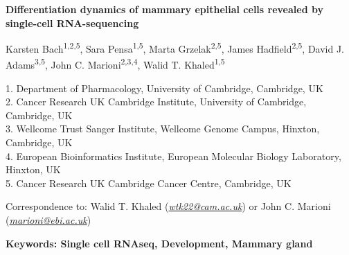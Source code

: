 \documentclass[titlepage, 12pt, oneside]{amsart}
\begin{document}
\begin{titlepage}
\large
\textbf{Differentiation dynamics of mammary epithelial cells revealed by
single-cell RNA-sequencing}
\normalsize

\small
Karsten Bach\textsuperscript{1,2,5}, Sara Pensa\textsuperscript{1,5},
Marta Grzelak\textsuperscript{2,5}, James Hadfield\textsuperscript{2,5},
David J. Adams\textsuperscript{3,5}, John C.
Marioni\textsuperscript{2,3,4}, Walid T. Khaled\textsuperscript{1,5 }

1. Department of Pharmacology, University of Cambridge, Cambridge, UK\\
2. Cancer Research UK Cambridge Institute, University of Cambridge,
Cambridge, UK\\
3. Wellcome Trust Sanger Institute, Wellcome Genome Campus, Hinxton,
Cambridge, UK\\
4. European Bioinformatics Institute, European Molecular Biology
Laboratory, Hinxton, UK\\
5. Cancer Research UK Cambridge Cancer Centre, Cambridge, UK

Correspondence to: Walid T. Khaled
(\href{mailto:wtk22@cam.ac.uk}{\emph{wtk22@cam.ac.uk}}) or John C.
Marioni (\href{mailto:marioni@ebi.ac.uk}{\emph{marioni@ebi.ac.uk}})

\normalsize
\textbf{Keywords: Single cell RNAseq, Development, Mammary gland }
\end{titlepage}
\end{document}
